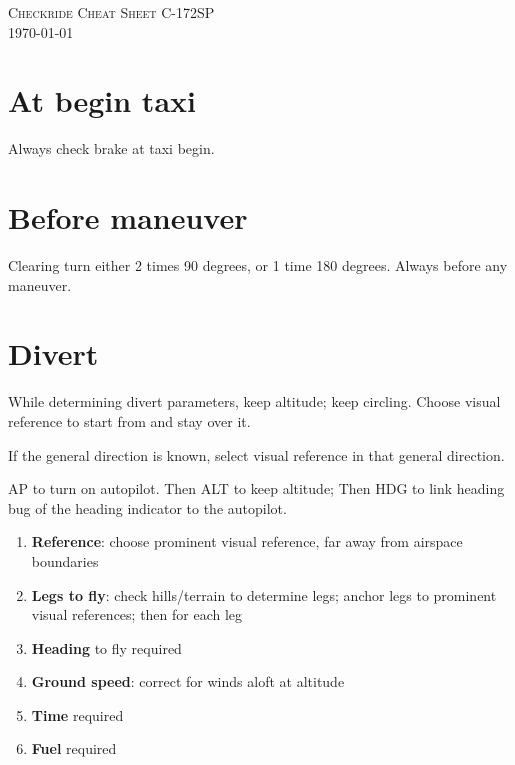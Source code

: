 \documentclass[article,9pt,landscape]{memoir}
\begin{document}



\begin{multicols*}{4}
  \textsc{Checkride Cheat Sheet C-172SP\\\today\\[0.5em]}

  \chapter{At begin taxi}
  Always check brake at taxi begin.

  \chapter{Before maneuver}
  Clearing turn either 2 times 90 degrees, or 1
  time 180 degrees.  Always before any maneuver.

  \chapter{Divert}
  While determining divert parameters, keep altitude; keep circling.  Choose
  visual reference to start from and stay over it.

  If the general direction is known, select visual reference in that
  general direction.
  
  \textsc{AP} to turn on autopilot.  Then \textsc{ALT} to keep
  altitude; Then \textsc{HDG} to link heading bug of the heading
  indicator to the autopilot.
  
  \begin{enumerate}
    \item \textbf{Reference}: choose prominent visual reference, far
      away from airspace boundaries

    \item \textbf{Legs to fly}: check hills/terrain to determine legs;
      anchor legs to prominent visual references; then for each leg

    \item \textbf{Heading} to fly required

    \item \textbf{Ground speed}: correct for winds aloft at altitude

    \item \textbf{Time} required

    \item \textbf{Fuel} required


\end{enumerate}
\end{multicols*}
\end{document}
